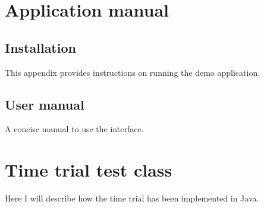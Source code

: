 \appendix
\chapter{Application manual}
\label{appendix:applicationmanual}

\section{Installation}
\label{section:installation}
This appendix provides instructions on running the demo application.

\section{User manual}
\label{section:usermanual}
A concise manual to use the interface.

\chapter{Time trial test class}
\label{appendix:timetrialtestclass}
Here I will describe how the time trial has been implemented in Java.